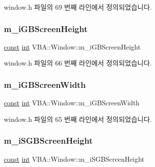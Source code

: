 window.\+h 파일의 69 번째 라인에서 정의되었습니다.

\mbox{\label{class_v_b_a_1_1_window_ad87b6a11eafd636e92c7a24af249af36}} 
\subsubsection{\texorpdfstring{m\+\_\+i\+G\+B\+Screen\+Height}{m\_iGBScreenHeight}}
{\footnotesize\ttfamily \mbox{\hyperlink{getopt1_8c_a2c212835823e3c54a8ab6d95c652660e}{const}} \mbox{\hyperlink{_util_8cpp_a0ef32aa8672df19503a49fab2d0c8071}{int}} V\+B\+A\+::\+Window\+::m\+\_\+i\+G\+B\+Screen\+Height}



window.\+h 파일의 66 번째 라인에서 정의되었습니다.

\mbox{\label{class_v_b_a_1_1_window_ab87ef83b1c563956f2ccb79f465e60a5}} 
\subsubsection{\texorpdfstring{m\+\_\+i\+G\+B\+Screen\+Width}{m\_iGBScreenWidth}}
{\footnotesize\ttfamily \mbox{\hyperlink{getopt1_8c_a2c212835823e3c54a8ab6d95c652660e}{const}} \mbox{\hyperlink{_util_8cpp_a0ef32aa8672df19503a49fab2d0c8071}{int}} V\+B\+A\+::\+Window\+::m\+\_\+i\+G\+B\+Screen\+Width}



window.\+h 파일의 65 번째 라인에서 정의되었습니다.

\mbox{\label{class_v_b_a_1_1_window_adc64e75d94960c2a9d0680465a838b5d}} 
\subsubsection{\texorpdfstring{m\+\_\+i\+S\+G\+B\+Screen\+Height}{m\_iSGBScreenHeight}}
{\footnotesize\ttfamily \mbox{\hyperlink{getopt1_8c_a2c212835823e3c54a8ab6d95c652660e}{const}} \mbox{\hyperlink{_util_8cpp_a0ef32aa8672df19503a49fab2d0c8071}{int}} V\+B\+A\+::\+Window\+::m\+\_\+i\+S\+G\+B\+Screen\+Height}




